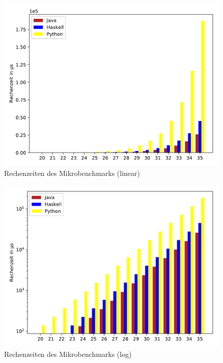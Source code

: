 \documentclass[11pt, parskip=half]{scrartcl}       %
\begin{document}
\begin{minipage}{\linewidth}
  \centering
  \begin{minipage}{0.45\linewidth}
    \begin{figure}[H]
      \includegraphics[width=\textwidth]{src/linear-microbench.pdf}
      \caption{Rechenzeiten des Mikrobenchmarks (linear)}
      \label{fig:micro-lin}
    \end{figure}
  \end{minipage}
  \hfill
  \begin{minipage}{0.45\linewidth}
    \begin{figure}[H]
      \includegraphics[width=\textwidth]{src/log-microbench.pdf}
      \caption{Rechenzeiten des Mikrobenchmarks (log)}
      \label{fig:micro-log}
    \end{figure}
  \end{minipage}
\end{minipage}
\end{document}
